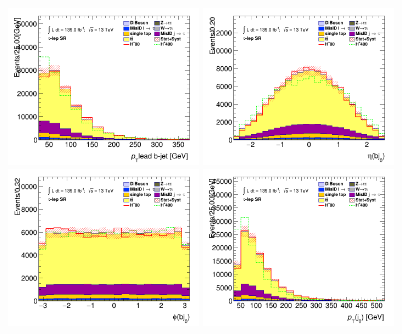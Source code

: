 		\begin{figure}[!htp]
			\begin{center}    
			\includegraphics[width=0.45\textwidth]{chapters/chapter6_HPlus/images/taulep/bjet_0_pt_SR_TAULEP.png}
			\includegraphics[width=0.45\textwidth]{chapters/chapter6_HPlus/images/taulep/bjet_0_eta_SR_TAULEP.png} \\
			\includegraphics[width=0.45\textwidth]{chapters/chapter6_HPlus/images/taulep/bjet_0_phi_SR_TAULEP.png}
			\includegraphics[width=0.45\textwidth]{chapters/chapter6_HPlus/images/taulep/jet_0_pt_SR_TAULEP.png} \\

\end{center}
\end{figure}
